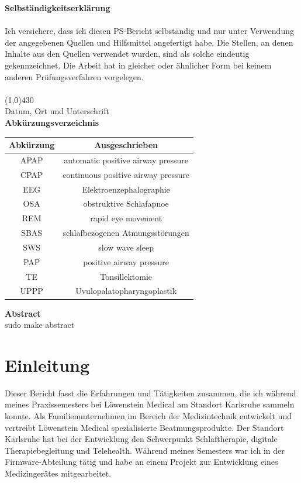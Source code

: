 \documentclass[a4paper, 12pt]{article}
\begin{document}
\newpage
{\bfseries \large Selbständigkeitserklärung}\\ \\
Ich versichere, dass ich diesen PS-Bericht selbständig und nur unter Verwendung der angegebenen
Quellen und Hilfsmittel angefertigt habe. Die Stellen, an denen Inhalte aus den Quellen verwendet
wurden, sind als solche eindeutig gekennzeichnet. Die Arbeit hat in gleicher oder ähnlicher Form bei
keinem anderen Prüfungsverfahren vorgelegen. \\
\vspace{1.0cm} \\
\line(1,0){430} \\
Datum, Ort und Unterschrift\\

\newpage
{\bfseries \large Abkürzungsverzeichnis}\\
\begin{table}[h!]
\centering
\begin{tabular}{c | c}
\hline
\textbf{Abkürzung} & \textbf{Ausgeschrieben} \\ 
\hline 
APAP & automatic positive airway pressure \\
CPAP & continuous positive airway pressure \\
EEG & Elektroenzephalographie \\
OSA & obstruktive Schlafapnoe \\ 
REM & rapid eye movement \\
SBAS & schlafbezogenen Atmungsstörungen \\ 
SWS & slow wave sleep \\
PAP & positive airway pressure \\
TE & Tonsillektomie \\
UPPP & Uvulopalatopharyngoplastik \\
\end{tabular} 
\end{table}

\newpage
{\bfseries \large Abstract}\\
sudo make abstract 

\newpage
\tableofcontents 

\newpage
\section{Einleitung}\label{Einleitung} 
Dieser Bericht fasst die Erfahrungen und Tätigkeiten zusammen, die ich während meines Praxissemesters bei Löwenstein Medical am Standort Karlsruhe sammeln konnte. Als Familienunternehmen im Bereich der Medizintechnik entwickelt und vertreibt Löwenstein Medical spezialisierte Beatmungsprodukte. Der Standort Karlsruhe hat bei der Entwicklung den Schwerpunkt Schlaftherapie, digitale Therapiebegleitung und Telehealth. Während meines Semesters war ich in der Firmware-Abteilung tätig und habe an einem Projekt zur Entwicklung eines Medizingerätes mitgearbeitet. 
\end{document}
